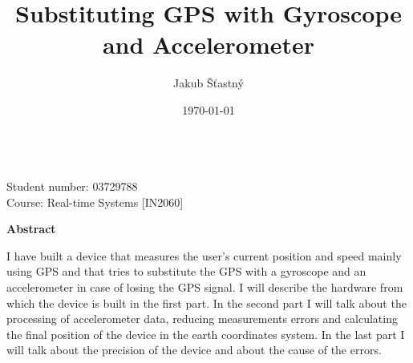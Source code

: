 \documentclass[hidelinks,a4paper]{article}
\author{Jakub Šťastný}
\title{Substituting GPS with Gyroscope and Accelerometer}
\date{\today}
\begin{document}
\begin{titlepage}
    \thispagestyle{plain}
    \begin{center}
        \Large
        \textbf{\@title}
            
        \vspace{0.4cm}
        \large
            
        \vspace{0.8cm}
        \textbf{\@author} \\
        {\small Student number: 03729788}\\
        {\small Course: Real-time Systems [IN2060] }
        
        \vspace{16cm}
        \textbf{Abstract}
    \end{center}
    I have built a device that measures the user's current position and speed mainly using GPS and that tries to substitute the GPS with a gyroscope and an accelerometer in case of losing the GPS signal. I will describe the hardware from which the device is built in the first part. In the second part I will talk about the processing of accelerometer data, reducing measurements errors and calculating the final position of the device in the earth coordinates system. In the last part I will talk about the precision of the device and about the cause of the errors. 
\end{titlepage}
\makeatother

\end{document}

